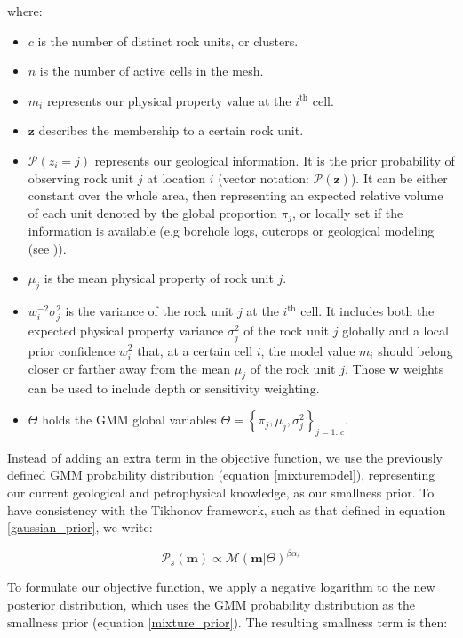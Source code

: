 \documentclass[extra]{gji} %
\begin{document}
where:
\begin{itemize}
\item $c$ is the number of distinct rock units, or clusters.
\item $n$ is the number of active cells in the mesh.
\item ${m}_i$ represents our physical property value at the $i^{\text{th}}$ cell.
\item $\mathbf{z}$ describes the membership to a certain rock unit.
\item $\mathcal{P}(z_{i}=j)$ represents our geological information. It is the prior probability of observing rock unit $j$ at location $i$ (vector notation: $\mathcal{P}(\mathbf{z})$). It can be either constant over the whole area, then representing an expected relative volume of each unit denoted by the global proportion $\pi_j$, or locally set if the information is available (e.g borehole logs, outcrops or geological modeling (see \cite{Giraud2017})).
\item ${\mu}_j$ is the mean physical property of rock unit $j$.
\item ${w}_{i}^{-2}\sigma_j^2$ is the variance of the rock unit $j$ at the $i^{\text{th}}$ cell. It includes both the expected physical property variance $\sigma_j^2$ of the rock unit $j$ globally and a local prior confidence ${w}_{i}^2$ that, at a certain cell $i$, the model value ${m}_i$ should belong closer or farther away from the mean ${\mu}_j$ of the rock unit $j$. Those $\mathbf{w}$ weights can be used to include depth or sensitivity weighting.
\item $\Theta$ holds the GMM global variables $\Theta= \left\{\pi_j, {\mu}_j, \sigma_j^2\right\}_{j=1..c}$.
\end{itemize}

Instead of adding an extra term in the objective function, we use the previously defined GMM probability distribution (equation \ref{mixturemodel}), representing our current geological and petrophysical knowledge, as our smallness prior. To have consistency with the Tikhonov framework, such as that defined in equation \ref{gaussian_prior}, we write:

\begin{equation}
\mathcal{P}_{s}(\mathbf{m}) \propto \mathcal{M}(\mathbf{m}|\Theta)^{\beta\alpha_s} \label{mixture_prior}
\end{equation}

To formulate our objective function, we apply a negative logarithm to the new posterior distribution, which uses the GMM probability distribution as the smallness prior (equation \ref{mixture_prior}). The resulting smallness term is then:
\end{document}
